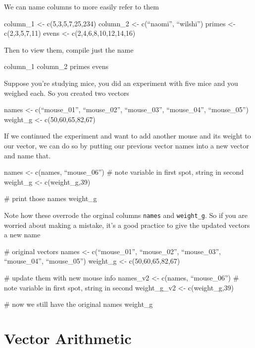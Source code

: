 \documentclass[11pt]{amsart}
\renewcommand{\(}{\left(}
\renewcommand{\)}{\right)}
\begin{document}
We can name columns to more easily refer to them

\begin{rcode}
  column_1 <- c(5,3,5,7,25,234)
  column_2 <- c(``naomi'', ``wilshi'')
  primes <- c(2,3,5,7,11)
  evens <- c(2,4,6,8,10,12,14,16)
\end{rcode}

Then to view them, compile just the name

\begin{rcode}
  column_1 
  column_2 
  primes 
  evens 
\end{rcode}

Suppose you're studying mice, you did an experiment with five mice and
you weighed each. So you created two vectors

\begin{rcode}
  names <- c(``mouse_01'', ``mouse_02'', ``mouse_03'', ``mouse_04'', ``mouse_05'')
  weight_g <- c(50,60,65,82,67)
\end{rcode}

If we continued the experiment and want to add another mouse and its
weight to our vector, we can do so by putting our previous vector
names into a new vector and name that.

\begin{rcode}
  names <- c(names, ``mouse_06'') # note variable in first spot, string in second
  weight_g <- c(weight_g,39)
  
  # print those
  names
  weight_g
\end{rcode} 

Note how these overrode the orginal columns \texttt{names} and \texttt{weight\_g}.  So if you are worried about making a mistake, it's a good practice to give the updated vectors a new name

\begin{rcode}
  # original vectors
  names <- c(``mouse_01'', ``mouse_02'', ``mouse_03'', ``mouse_04'', ``mouse_05'')
  weight_g <- c(50,60,65,82,67)
  
  # update them with new mouse info    
  names_v2 <- c(names, ``mouse_06'') # note variable in first spot, string in second
  weight_g_v2 <- c(weight_g,39)
  
  # now we still have the original
  names
  weight_g
\end{rcode} 

\section{Vector Arithmetic}
\end{document}
